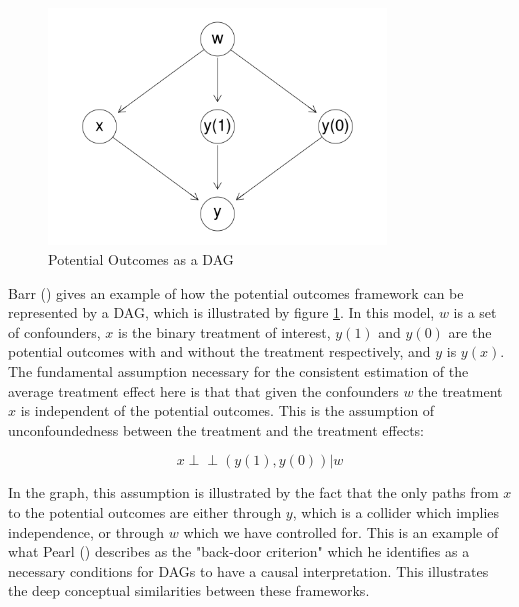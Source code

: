 \documentclass{article}
\begin{document}
\begin{figure}
  \centering
  \includegraphics[width=0.8\textwidth]{images/potential_outcomes_dag.png}
  \caption{Potential Outcomes as a DAG}
  \label{dag6}
\end{figure}

Barr (\citeyear{barr2018causal}) gives an example of how the potential outcomes framework can be represented by a DAG, which is illustrated by figure \ref{dag6}. In this model, $w$ is a set of confounders, $x$ is the binary treatment of interest, $y(1)$ and $y(0)$ are the potential outcomes with and without the treatment respectively, and $y$ is $y(x)$. The fundamental assumption necessary for the consistent estimation of the average treatment effect here is that that given the confounders $w$ the treatment $x$ is independent of the potential outcomes. This is the assumption of unconfoundedness between the treatment and the treatment effects:
 
\begin{equation}
  x \perp \!\!\! \perp  (y(1), y(0)) | w
\end{equation}

In the graph, this assumption is illustrated by the fact that the only paths from $x$ to the potential outcomes are either through $y$, which is a collider which implies independence, or through $w$ which we have controlled for. This is an example of what Pearl (\citeyear{pearl2018book}) describes as the "back-door criterion" which he identifies as a necessary conditions for DAGs to have a causal interpretation. This illustrates the deep conceptual similarities between these frameworks.
\end{document}
